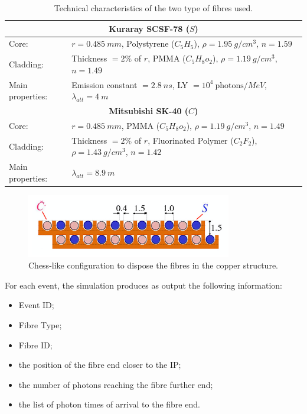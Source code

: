 \begin{table}
	\centering
	\setlength{\tabcolsep}{12pt}
	\begin{tabular}{lp{}}
		\toprule
		\multicolumn{2}{c}{\textbf{Kuraray SCSF-78 ($S$)}}	\\
		\midrule
		Core:				& $r = 0.485\ mm$, Polystyrene ($C_5H_5$), $\rho=1.95\ g/cm^3$, $n = 1.59$	\\
		Cladding: 			& Thickness $=2\%$ of $r$, PMMA ($C_5H_8o_2$), $\rho=1.19\ g/cm^3$, $n=1.49$	\\
		Main properties:	& Emission constant $= 2.8\ ns$, LY $= 10^4\ \text{photons}/MeV$, $\lambda_{att} = 4\ m$	\\
		\midrule
		\multicolumn{2}{c}{\textbf{Mitsubishi SK-40 ($C$)}}	\\
		\midrule
		Core:				& $r = 0.485\ mm$, PMMA ($C_5H_8o_2$), $\rho=1.19\ g/cm^3$, $n = 1.49$	\\
		Cladding: 			& Thickness $=2\%$ of $r$, Fluorinated Polymer ($C_2F_2$), $\rho=1.43\ g/cm^3$, $n=1.42$	\\
		Main properties:	& $\lambda_{att} = 8.9\ m$	\\
		\bottomrule
	\end{tabular}
	\caption{Technical characteristics of the two type of fibres used.}
	\label{tab:fibres}
\end{table}

\begin{figure}
	\centering
	\includegraphics[width=0.8\textwidth]{IMG/DRCGeometry2}
	\caption{Chess-like configuration to dispose the fibres in the copper structure.}
	\label{fig:CS_fibres}
\end{figure}

For each event, the simulation produces as output the following information: 
\begin{itemize}
	\item Event ID;
	\item Fibre Type;
	\item Fibre ID;
	\item the position of the fibre end closer to the IP;
	\item the number of photons reaching the fibre further end;
	\item the list of photon times of arrival to the fibre end.
\end{itemize}

